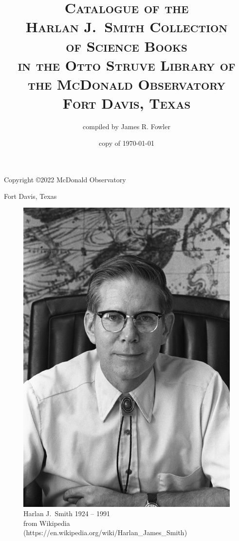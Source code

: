 \documentclass[letterpaper]{book}
\begin{document}
\frontmatter
\pagestyle{empty}
\title{\textsc{Catalogue of the \\
    Harlan J.\ Smith Collection \\
    of Science Books \\
    in the Otto Struve Library of \\
    the McDonald Observatory \\
    Fort Davis, Texas}}
\author{compiled by James R. Fowler}
\date{copy of \today}
\maketitle
\newpage
\vspace*{5 in}
\centerline{Copyright \copyright 2022 McDonald Observatory}
\centerline{Fort Davis, Texas}
\newpage

\pagestyle{plain}
\begin{figure}[t]
  \centering
  \includegraphics{hjs_photo.jpg}
  Harlan J.~Smith 1924 -- 1991 \\
  from Wikipedia
  (https://en.wikipedia.org/wiki/Harlan\_James\_Smith)
  \label{fig:hjs}
\end{figure}
\clearpage
\mbox{}
\thispagestyle{empty}
\newpage
\end{document}
